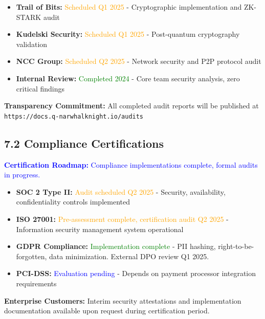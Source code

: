 \documentclass[11pt,a4paper]{article}
\begin{document}
\begin{itemize}
    \item \textbf{Trail of Bits:} \textcolor{orange}{Scheduled Q1 2025} - Cryptographic implementation and ZK-STARK audit

    \item \textbf{Kudelski Security:} \textcolor{orange}{Scheduled Q1 2025} - Post-quantum cryptography validation

    \item \textbf{NCC Group:} \textcolor{orange}{Scheduled Q2 2025} - Network security and P2P protocol audit

    \item \textbf{Internal Review:} \textcolor{green}{Completed 2024} - Core team security analysis, zero critical findings
\end{itemize}

\textbf{Transparency Commitment:} All completed audit reports will be published at \texttt{https://docs.q-narwhalknight.io/audits}

\subsection{7.2 Compliance Certifications}

\textcolor{blue}{\textbf{Certification Roadmap:} Compliance implementations complete, formal audits in progress.}

\begin{itemize}
    \item \textbf{SOC 2 Type II:} \textcolor{orange}{Audit scheduled Q2 2025} - Security, availability, confidentiality controls implemented

    \item \textbf{ISO 27001:} \textcolor{orange}{Pre-assessment complete, certification audit Q2 2025} - Information security management system operational

    \item \textbf{GDPR Compliance:} \textcolor{green}{Implementation complete} - PII hashing, right-to-be-forgotten, data minimization. External DPO review Q1 2025.

    \item \textbf{PCI-DSS:} \textcolor{blue}{Evaluation pending} - Depends on payment processor integration requirements
\end{itemize}

\vspace{0.3cm}
\noindent
\textbf{Enterprise Customers:} Interim security attestations and implementation documentation available upon request during certification period.
\end{document}

